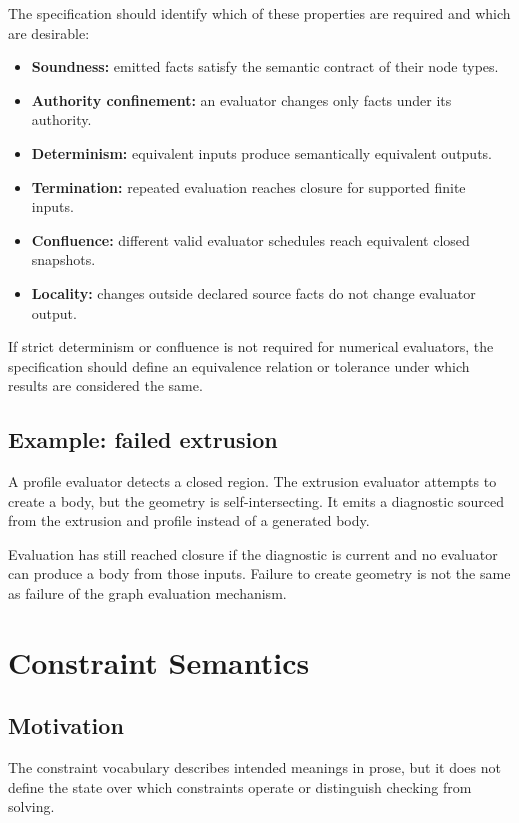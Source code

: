 \documentclass[11pt]{article}
\begin{document}
The specification should identify which of these properties are required and
which are desirable:

\begin{itemize}
  \item \textbf{Soundness:} emitted facts satisfy the semantic contract of their
    node types.
  \item \textbf{Authority confinement:} an evaluator changes only facts under
    its authority.
  \item \textbf{Determinism:} equivalent inputs produce semantically equivalent
    outputs.
  \item \textbf{Termination:} repeated evaluation reaches closure for supported
    finite inputs.
  \item \textbf{Confluence:} different valid evaluator schedules reach
    equivalent closed snapshots.
  \item \textbf{Locality:} changes outside declared source facts do not change
    evaluator output.
\end{itemize}

If strict determinism or confluence is not required for numerical evaluators,
the specification should define an equivalence relation or tolerance under
which results are considered the same.

\subsection{Example: failed extrusion}

A profile evaluator detects a closed region. The extrusion evaluator attempts
to create a body, but the geometry is self-intersecting. It emits a diagnostic
sourced from the extrusion and profile instead of a generated body.

Evaluation has still reached closure if the diagnostic is current and no
evaluator can produce a body from those inputs. Failure to create geometry is
not the same as failure of the graph evaluation mechanism.

\section{Constraint Semantics}

\subsection{Motivation}

The constraint vocabulary describes intended meanings in prose, but it does not
define the state over which constraints operate or distinguish checking from
solving.
\end{document}
